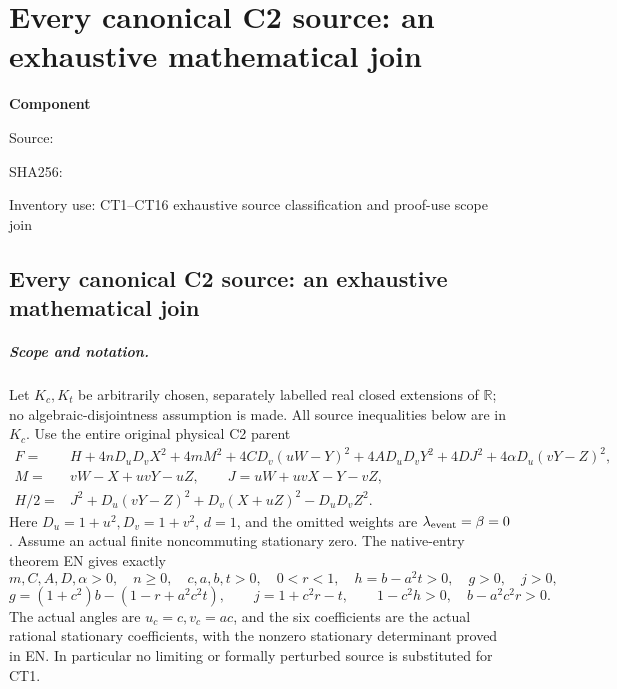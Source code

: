 \chapter{Every canonical C2 source: an exhaustive mathematical join}
\label{component:pe351eb06b28b}
\noindent\textbf{Component }\par
{\small\noindent Source: \par}
{\small\noindent SHA256: \par}
{\small\noindent Inventory use: CT1--CT16 exhaustive source classification and proof-use scope join\par}
\medskip
\section{Every canonical C2 source: an exhaustive mathematical join}
\label{pe351eb06b28b:sec:c2-complete-source-routing}

\paragraph{Scope and notation.}
Let \(K_c,K_t\) be arbitrarily chosen, separately labelled real closed
extensions of \(\mathbb R\); no algebraic-disjointness assumption is made.
All source inequalities below are in \(K_c\).
Use the entire original physical C2 parent
\[
\begin{split}
 F={}&H+4nD_uD_vX^2+4mM^2+4CD_v(uW-Y)^2
       +4AD_uD_vY^2+4DJ^2+4\alpha D_u(vY-Z)^2,\\
 M={}&vW-X+uvY-uZ,\qquad J=uW+uvX-Y-vZ,\\
 H/2={}&J^2+D_u(vY-Z)^2+D_v(X+uZ)^2-D_uD_vZ^2 .
\end{split}\tag{CT1}
\]
Here \(D_u=1+u^2,D_v=1+v^2\), \(d=1\), and the omitted weights are
\(\lambda_{\rm event}=\beta=0\).  Assume an actual finite noncommuting
stationary zero.  The native-entry theorem EN gives exactly
\[
 m,C,A,D,\alpha>0,\quad n\geq0,\quad
 c,a,b,t>0,\quad 0<r<1,\quad
 h=b-a^2t>0,\quad g>0,\quad j>0,
\]
\[
 g=(1+c^2)b-(1-r+a^2c^2t),\qquad j=1+c^2r-t,\qquad
 1-c^2h>0,\quad b-a^2c^2r>0.                    \tag{CT2}
\]
The actual angles are \(u_c=c,v_c=ac\), and the six coefficients
are the actual rational stationary coefficients, with the nonzero
stationary determinant proved in EN.  In particular no limiting or
formally perturbed source is substituted for CT1.

